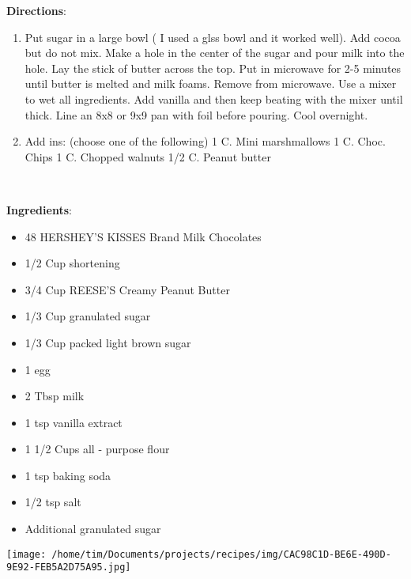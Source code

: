 \documentclass[11pt, twoside, openany]{book}
\begin{document}
\textbf{Directions}:
\vspace{-3mm}\begin{enumerate}\setlength\itemsep{-1mm}
\item Put sugar in a large bowl ( I used a glss bowl and it worked well). Add cocoa but do not mix. Make a hole in the center of the sugar and pour milk into the hole. Lay the stick of butter across the top. Put in microwave for 2-5 minutes until butter is melted and milk foams. Remove from microwave. Use a mixer to wet all ingredients. Add vanilla and then keep beating with the mixer until thick. Line an 8x8 or 9x9 pan with foil before pouring. Cool overnight. 
\item Add ins: (choose one of the following)
1 C. Mini marshmallows
1 C. Choc. Chips
1 C. Chopped walnuts
1/2 C. Peanut butter
\end{enumerate}
 \label{peanut-butter-blossoms-recipe}\hfill\textit{}\\
\begin{minipage}[t]{0.8\linewidth}
\textbf{Ingredients}:\vspace{-3mm}
\begin{multicols}{2}
\begin{itemize}\setlength\itemsep{-1mm}
\item 48 HERSHEY'S KISSES Brand Milk Chocolates
\item 1/2 Cup shortening
\item 3/4 Cup REESE'S Creamy Peanut Butter
\item 1/3 Cup granulated sugar
\item 1/3 Cup packed light brown sugar
\item 1 egg
\item 2 Tbsp milk
\item 1 tsp vanilla extract
\item 1 1/2 Cups all - purpose flour
\item 1 tsp baking soda
\item 1/2 tsp salt
\item Additional granulated sugar
\end{itemize}
\end{multicols}
\end{minipage}
\begin{minipage}[t]{0.2\linewidth}
\centering \strut\vspace*{-\baselineskip}\newline
\texttt{[image: /home/tim/Documents/projects/recipes/img/CAC98C1D-BE6E-490D-9E92-FEB5A2D75A95.jpg]}\\
\end{minipage}\vspace{3mm}
\end{document}
